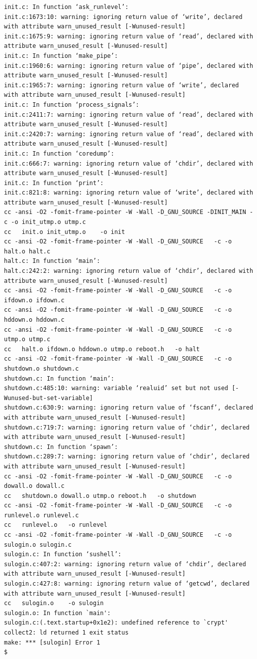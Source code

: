 {\begin{shaded}
\begin{verbatim}
init.c: In function ‘ask_runlevel’:
init.c:1673:10: warning: ignoring return value of ‘write’, declared with attribute warn_unused_result [-Wunused-result]
init.c:1675:9: warning: ignoring return value of ‘read’, declared with attribute warn_unused_result [-Wunused-result]
init.c: In function ‘make_pipe’:
init.c:1960:6: warning: ignoring return value of ‘pipe’, declared with attribute warn_unused_result [-Wunused-result]
init.c:1965:7: warning: ignoring return value of ‘write’, declared with attribute warn_unused_result [-Wunused-result]
init.c: In function ‘process_signals’:
init.c:2411:7: warning: ignoring return value of ‘read’, declared with attribute warn_unused_result [-Wunused-result]
init.c:2420:7: warning: ignoring return value of ‘read’, declared with attribute warn_unused_result [-Wunused-result]
init.c: In function ‘coredump’:
init.c:666:7: warning: ignoring return value of ‘chdir’, declared with attribute warn_unused_result [-Wunused-result]
init.c: In function ‘print’:
init.c:821:8: warning: ignoring return value of ‘write’, declared with attribute warn_unused_result [-Wunused-result]
cc -ansi -O2 -fomit-frame-pointer -W -Wall -D_GNU_SOURCE -DINIT_MAIN -c -o init_utmp.o utmp.c
cc   init.o init_utmp.o    -o init
cc -ansi -O2 -fomit-frame-pointer -W -Wall -D_GNU_SOURCE   -c -o halt.o halt.c
halt.c: In function ‘main’:
halt.c:242:2: warning: ignoring return value of ‘chdir’, declared with attribute warn_unused_result [-Wunused-result]
cc -ansi -O2 -fomit-frame-pointer -W -Wall -D_GNU_SOURCE   -c -o ifdown.o ifdown.c
cc -ansi -O2 -fomit-frame-pointer -W -Wall -D_GNU_SOURCE   -c -o hddown.o hddown.c
cc -ansi -O2 -fomit-frame-pointer -W -Wall -D_GNU_SOURCE   -c -o utmp.o utmp.c
cc   halt.o ifdown.o hddown.o utmp.o reboot.h   -o halt
cc -ansi -O2 -fomit-frame-pointer -W -Wall -D_GNU_SOURCE   -c -o shutdown.o shutdown.c
shutdown.c: In function ‘main’:
shutdown.c:485:10: warning: variable ‘realuid’ set but not used [-Wunused-but-set-variable]
shutdown.c:630:9: warning: ignoring return value of ‘fscanf’, declared with attribute warn_unused_result [-Wunused-result]
shutdown.c:719:7: warning: ignoring return value of ‘chdir’, declared with attribute warn_unused_result [-Wunused-result]
shutdown.c: In function ‘spawn’:
shutdown.c:289:7: warning: ignoring return value of ‘chdir’, declared with attribute warn_unused_result [-Wunused-result]
cc -ansi -O2 -fomit-frame-pointer -W -Wall -D_GNU_SOURCE   -c -o dowall.o dowall.c
cc   shutdown.o dowall.o utmp.o reboot.h   -o shutdown
cc -ansi -O2 -fomit-frame-pointer -W -Wall -D_GNU_SOURCE   -c -o runlevel.o runlevel.c
cc   runlevel.o   -o runlevel
cc -ansi -O2 -fomit-frame-pointer -W -Wall -D_GNU_SOURCE   -c -o sulogin.o sulogin.c
sulogin.c: In function ‘sushell’:
sulogin.c:407:2: warning: ignoring return value of ‘chdir’, declared with attribute warn_unused_result [-Wunused-result]
sulogin.c:427:8: warning: ignoring return value of ‘getcwd’, declared with attribute warn_unused_result [-Wunused-result]
cc   sulogin.o    -o sulogin
sulogin.o: In function `main':
sulogin.c:(.text.startup+0x1e2): undefined reference to `crypt'
collect2: ld returned 1 exit status
make: *** [sulogin] Error 1
$ 
\end{verbatim}\end{shaded}}

